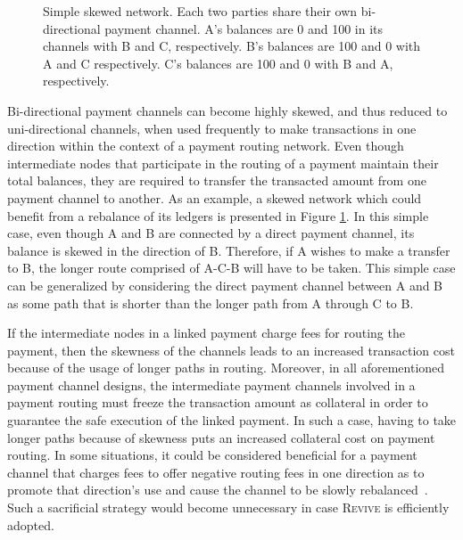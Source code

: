 \documentclass[sigconf]{acmart}
\newcommand{\name}{\textsc{Revive}\xspace}
\begin{document}
\begin{figure}[h]
\centering
{}
\caption{Simple skewed network. Each two parties share their own bi-directional payment channel. A's balances are 0 and 100 in its channels with B and C, respectively. B's balances are 100 and 0 with A and C respectively. C's balances are 100 and 0 with B and A, respectively.}
\label{skewed}
\end{figure}

Bi-directional payment channels can become highly skewed, and thus reduced to uni-directional channels, when used frequently to make transactions in one direction within the context of a payment routing network. Even though intermediate nodes that participate in the routing of a payment maintain their total balances, they are required to transfer the transacted amount from one payment channel to another.
As an example, a skewed network which could benefit from a rebalance of its ledgers is presented in Figure \ref{skewed}. In this simple case, even though A and B are connected by a direct payment channel, its balance is skewed in the direction of B. Therefore, if A wishes to make a transfer to B, the longer route comprised of A-C-B will have to be taken. This simple case can be generalized by considering the direct payment channel between A and B as some path that is shorter than the longer path from A through C to B.

If the intermediate nodes in a linked payment charge fees for routing the payment, then the skewness of the channels leads to an increased transaction cost because of the usage of longer paths in routing.
Moreover, in all aforementioned payment channel designs, the intermediate payment channels involved in a payment routing must freeze the transaction amount as collateral in order to guarantee the safe execution of the linked payment. In such a case, having to take longer paths because of skewness puts an increased collateral cost on payment routing.
In some situations, it could be considered beneficial for a payment channel that charges fees to offer negative routing fees in one direction as to promote that direction's use and cause the channel to be slowly rebalanced~\cite{negativefees}. Such a sacrificial strategy would become unnecessary in case \name is efficiently adopted.
\end{document}
